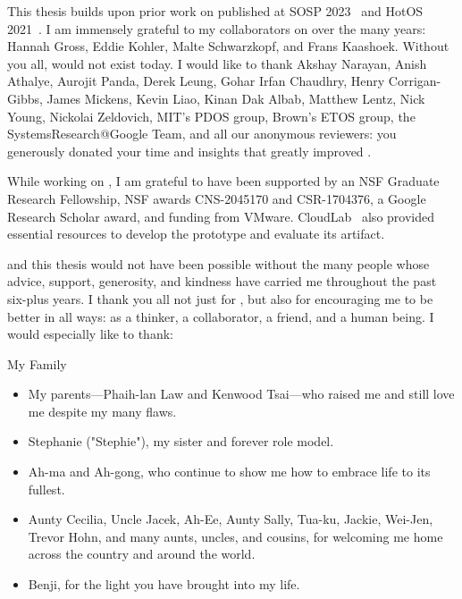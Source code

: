 %
This thesis builds upon prior work on \sys published at SOSP 2023~\cite{edna}
and HotOS 2021~\cite{edna-hotos}.
I am immensely grateful to my collaborators on \sys over the many years: Hannah
Gross, Eddie Kohler, Malte Schwarzkopf, and Frans Kaashoek. Without you all,
\sys would not exist today.
%
I would like to thank Akshay Narayan, Anish Athalye, Aurojit Panda, Derek
Leung, Gohar Irfan Chaudhry, Henry Corrigan-Gibbs, James Mickens, Kevin Liao,
Kinan Dak Albab, Matthew Lentz, Nick Young, Nickolai Zeldovich, MIT's PDOS
group, Brown's ETOS group, the SystemsResearch@\-Google Team, and all our
anonymous reviewers: you generously donated your time and insights that greatly
improved \sys. 
%

%
While working on \sys, I am grateful to have been supported by an NSF Graduate
Research Fellowship, NSF awards CNS-2045170 and CSR-1704376, a Google Research
Scholar award, and funding from VMware.
%
CloudLab~\cite{cloudlab} also provided essential resources
to develop the \sys prototype and evaluate its artifact.
%

%
\sys and this thesis would not have been possible without the many people whose
advice, support, generosity, and kindness have carried me throughout the past
six-plus years.
%
I thank you all not just for \sys, but also for encouraging me to be better in
all ways: as a thinker, a collaborator, a friend, and a human being.
%
I would especially like to thank:

\begin{center}{My Family}\end{center}
    \begin{itemize}
    \item My parents---Phaih-lan Law and Kenwood Tsai---who raised me and still love me despite my many flaws. 
    
    \item Stephanie ("Stephie"), my sister and forever role model. 
     
     \item Ah-ma and Ah-gong, who continue to show me how to embrace life to its fullest. 
        
    \item Aunty Cecilia, Uncle Jacek, Ah-Ee, Aunty Sally, Tua-ku, Jackie,
        Wei-Jen, Trevor Hohn, and many aunts, uncles, and cousins, for welcoming
            me home across the country and around the world.

    \item Benji, for the light you have brought into my life.
    \end{itemize}

